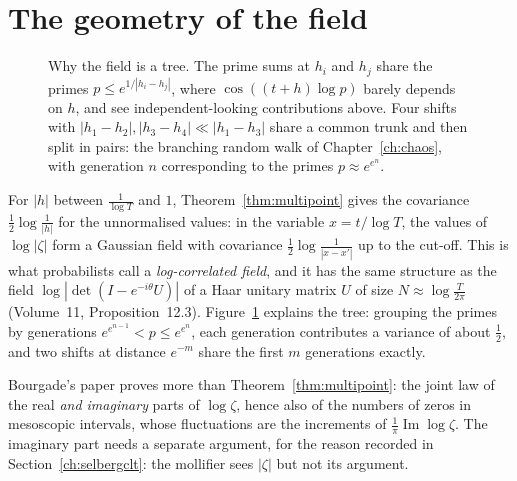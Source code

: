\section{The geometry of the field}

\begin{figure}[ht]\centering
{}
\caption{Why the field is a tree. The prime sums at $h_i$ and $h_j$ share the primes $p\le e^{1/|h_i-h_j|}$, where $\cos((t+h)\log p)$ barely depends on $h$, and see independent-looking contributions above. Four shifts with $|h_1-h_2|,|h_3-h_4|\ll|h_1-h_3|$ share a common trunk and then split in pairs: the branching random walk of Chapter~\ref{ch:chaos}, with generation $n$ corresponding to the primes $p\approx e^{e^n}$.}
\label{fig:fieldtree}
\end{figure}

For $|h|$ between $\frac1{\log T}$ and $1$, Theorem~\ref{thm:multipoint} gives the covariance $\frac12\log\frac1{|h|}$ for the unnormalised values: in the variable $x=t/\log T$, the values of $\log|\zeta|$ form a Gaussian field with covariance $\frac12\log\frac1{|x-x'|}$ up to the cut-off. This is what probabilists call a \emph{log-correlated field}, and it has the same structure as the field $\log|\det(I-e^{-i\theta}U)|$ of a Haar unitary matrix $U$ of size $N\approx\log\frac T{2\pi}$ (Volume~11, Proposition~12.3). Figure~\ref{fig:fieldtree} explains the tree: grouping the primes by generations $e^{e^{n-1}}<p\le e^{e^n}$, each generation contributes a variance of about $\frac12$, and two shifts at distance $e^{-m}$ share the first $m$ generations exactly.

\begin{remark}\label{rem:bourgade}
Bourgade's paper proves more than Theorem~\ref{thm:multipoint}: the joint law of the real \emph{and imaginary} parts of $\log\zeta$, hence also of the numbers of zeros in mesoscopic intervals, whose fluctuations are the increments of $\frac1\pi\operatorname{Im}\log\zeta$. The imaginary part needs a separate argument, for the reason recorded in Section~\ref{ch:selbergclt}: the mollifier sees $|\zeta|$ but not its argument.
\end{remark}

